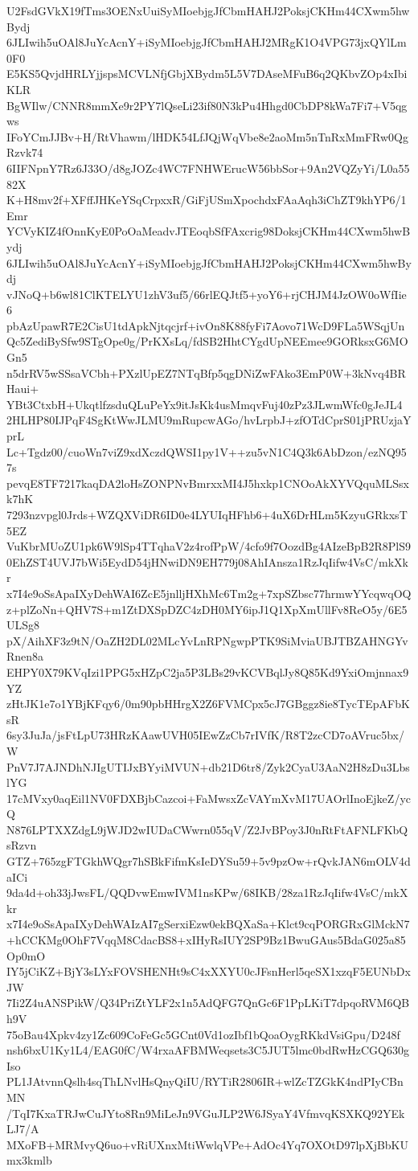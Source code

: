 U2FsdGVkX19fTms3OENxUuiSyMIoebjgJfCbmHAHJ2PoksjCKHm44CXwm5hwBydj
6JLIwih5uOAl8JuYcAcnY+iSyMIoebjgJfCbmHAHJ2MRgK1O4VPG73jxQYlLm0F0
E5KS5QvjdHRLYjjspsMCVLNfjGbjXBydm5L5V7DAseMFuB6q2QKbvZOp4xIbiKLR
BgWIlw/CNNR8mmXe9r2PY7lQseLi23if80N3kPu4Hhgd0CbDP8kWa7Fi7+V5qgws
IFoYCmJJBv+H/RtVhawm/lHDK54LfJQjWqVbe8e2aoMm5nTnRxMmFRw0QgRzvk74
6IIFNpnY7Rz6J33O/d8gJOZc4WC7FNHWErucW56bbSor+9An2VQZyYi/L0a5582X
K+H8mv2f+XFffJHKeYSqCrpxxR/GiFjUSmXpochdxFAaAqh3iChZT9khYP6/1Emr
YCVyKIZ4fOnnKyE0PoOaMeadvJTEoqbSfFAxcrig98DoksjCKHm44CXwm5hwBydj
6JLIwih5uOAl8JuYcAcnY+iSyMIoebjgJfCbmHAHJ2PoksjCKHm44CXwm5hwBydj
vJNoQ+b6wl81ClKTELYU1zhV3uf5/66rlEQJtf5+yoY6+rjCHJM4JzOW0oWfIie6
pbAzUpawR7E2CisU1tdApkNjtqcjrf+ivOn8K88fyFi7Aovo71WcD9FLa5WSqjUn
Qc5ZediBySfw9STgOpe0g/PrKXsLq/fdSB2HhtCYgdUpNEEmee9GORksxG6MOGn5
n5drRV5wSSsaVCbh+PXzlUpEZ7NTqBfp5qgDNiZwFAko3EmP0W+3kNvq4BRHaui+
YBt3CtxbH+UkqtlfzsduQLuPeYx9itJsKk4usMmqvFuj40zPz3JLwmWfc0gJeJL4
2HLHP80IJPqF4SgKtWwJLMU9mRupcwAGo/hvLrpbJ+zfOTdCprS01jPRUzjaYprL
Lc+Tgdz00/cuoWn7viZ9xdXczdQWSI1py1V++zu5vN1C4Q3k6AbDzon/ezNQ957s
pevqE8TF7217kaqDA2loHsZONPNvBmrxxMI4J5hxkp1CNOoAkXYVQquMLSsxk7hK
7293nzvpgl0Jrds+WZQXViDR6ID0e4LYUIqHFhb6+4uX6DrHLm5KzyuGRkxsT5EZ
VuKbrMUoZU1pk6W9lSp4TTqhaV2z4rofPpW/4cfo9f7OozdBg4AIzeBpB2R8PlS9
0EhZST4UVJ7bWi5EydD54jHNwiDN9EH779j08AhIAnsza1RzJqIifw4VsC/mkXkr
x7I4e9oSsApaIXyDehWAI6ZcE5jnlljHXhMc6Tm2g+7xpSZbsc77hrmwYYcqwqOQ
z+plZoNn+QHV7S+m1ZtDXSpDZC4zDH0MY6ipJ1Q1XpXmUllFv8ReO5y/6E5ULSg8
pX/AihXF3z9tN/OaZH2DL02MLcYvLnRPNgwpPTK9SiMviaUBJTBZAHNGYvRnen8a
EHPY0X79KVqIzi1PPG5xHZpC2ja5P3LBs29vKCVBqlJy8Q85Kd9YxiOmjnnax9YZ
zHtJK1e7o1YBjKFqy6/0m90pbHHrgX2Z6FVMCpx5cJ7GBggz8ie8TycTEpAFbKsR
6sy3JuJa/jsFtLpU73HRzKAawUVH05IEwZzCb7rIVfK/R8T2zcCD7oAVruc5bx/W
PnV7J7AJNDhNJIgUTIJxBYyiMVUN+db21D6tr8/Zyk2CyaU3AaN2H8zDu3LbslYG
17cMVxy0aqEil1NV0FDXBjbCazcoi+FaMwsxZcVAYmXvM17UAOrlInoEjkeZ/ycQ
N876LPTXXZdgL9jWJD2wIUDaCWwrn055qV/Z2JvBPoy3J0nRtFtAFNLFKbQsRzvn
GTZ+765zgFTGkhWQgr7hSBkFifmKsIeDYSu59+5v9pzOw+rQvkJAN6mOLV4daICi
9da4d+oh33jJwsFL/QQDvwEmwIVM1nsKPw/68IKB/28za1RzJqIifw4VsC/mkXkr
x7I4e9oSsApaIXyDehWAIzAI7gSerxiEzw0ekBQXaSa+Klct9cqPORGRxGlMckN7
+hCCKMg0OhF7VqqM8CdacBS8+xIHyRsIUY2SP9Bz1BwuGAus5BdaG025a85Op0mO
IY5jCiKZ+BjY3sLYxFOVSHENHt9sC4xXXYU0cJFsnHerl5qeSX1xzqF5EUNbDxJW
7Ii2Z4uANSPikW/Q34PriZtYLF2x1n5AdQFG7QnGc6F1PpLKiT7dpqoRVM6QBh9V
75oBau4Xpkv4zy1Zc609CoFeGc5GCnt0Vd1ozIbf1bQoaOygRKkdVsiGpu/D248f
nsh6bxU1Ky1L4/EAG0fC/W4rxaAFBMWeqsets3C5JUT5lmc0bdRwHzCGQ630gIso
PL1JAtvnnQslh4sqThLNvlHsQnyQiIU/RYTiR2806IR+wlZcTZGkK4ndPIyCBnMN
/TqI7KxaTRJwCuJYto8Rn9MiLeJn9VGuJLP2W6JSyaY4VfmvqKSXKQ92YEkLJ7/A
MXoFB+MRMvyQ6uo+vRiUXnxMtiWwlqVPe+AdOc4Yq7OXOtD97lpXjBbKUmx3kmlb
